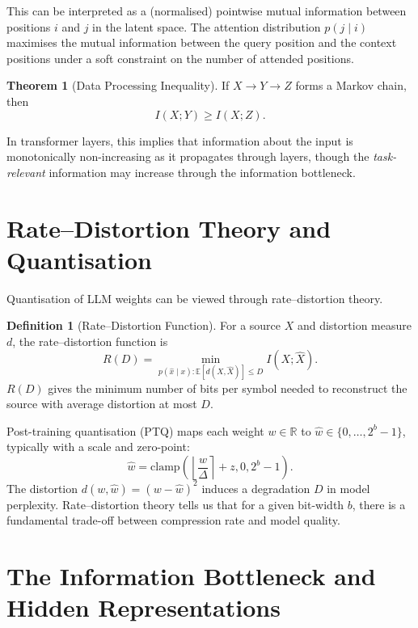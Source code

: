 \documentclass[11pt,a4paper]{book}
\theoremstyle{definition}
\newtheorem{definition}{Definition}[chapter]
\newtheorem{theorem}{Theorem}[chapter]
\begin{document}
This can be interpreted as a (normalised) pointwise mutual information between positions $i$ and $j$ in the latent space. The attention distribution $p(j \mid i)$ maximises the mutual information between the query position and the context positions under a soft constraint on the number of attended positions.

\begin{theorem}[Data Processing Inequality]
	If $X \to Y \to Z$ forms a Markov chain, then
	\begin{equation}
		I(X;Y) \geq I(X;Z).
	\end{equation}
\end{theorem}

In transformer layers, this implies that information about the input is monotonically non-increasing as it propagates through layers, though the \emph{task-relevant} information may increase through the information bottleneck.

\section{Rate--Distortion Theory and Quantisation}

Quantisation of LLM weights can be viewed through rate--distortion theory.

\begin{definition}[Rate--Distortion Function]
	For a source $X$ and distortion measure $d$, the rate--distortion function is
	\begin{equation}
		R(D) = \min_{p(\hat{x} \mid x): \mathbb{E}[d(X,\hat{X})] \leq D} I(X; \hat{X}).
	\end{equation}
	$R(D)$ gives the minimum number of bits per symbol needed to reconstruct the source with average distortion at most $D$.
\end{definition}

Post-training quantisation (PTQ) maps each weight $w \in \mathbb{R}$ to $\hat{w} \in \{0, \dots, 2^b-1\}$, typically with a scale and zero-point:
\begin{equation}
	\hat{w} = \text{clamp}\left(\left\lfloor \frac{w}{\Delta} \right\rceil + z, 0, 2^b-1\right).
\end{equation}
The distortion $d(w,\hat{w}) = (w - \hat{w})^2$ induces a degradation $D$ in model perplexity. Rate--distortion theory tells us that for a given bit-width $b$, there is a fundamental trade-off between compression rate and model quality.

\section{The Information Bottleneck and Hidden Representations}
\end{document}
